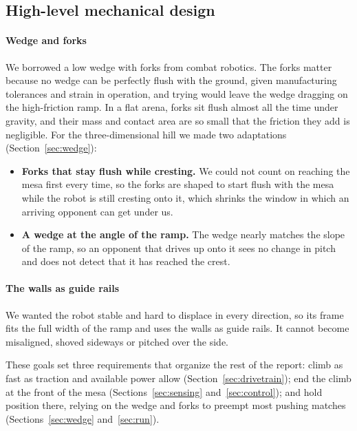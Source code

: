 \subsection{High-level mechanical design}
\label{sec:concept}

\paragraph{Wedge and forks}
We borrowed a low wedge with forks from combat robotics. The forks matter because no wedge can be perfectly flush with the ground, given manufacturing tolerances and strain in operation, and trying would leave the wedge dragging on the high-friction ramp. In a flat arena, forks sit flush almost all the time under gravity, and their mass and contact area are so small that the friction they add is negligible. For the three-dimensional hill we made two adaptations (Section~\ref{sec:wedge}):
\begin{itemize}
  \item \textbf{Forks that stay flush while cresting.} We could not count on reaching the mesa first every time, so the forks are shaped to start flush with the mesa while the robot is still cresting onto it, which shrinks the window in which an arriving opponent can get under us.
  \item \textbf{A wedge at the angle of the ramp.} The wedge nearly matches the slope of the ramp, so an opponent that drives up onto it sees no change in pitch and does not detect that it has reached the crest.
\end{itemize}

\paragraph{The walls as guide rails}
We wanted the robot stable and hard to displace in every direction, so its frame fits the full width of the ramp and uses the walls as guide rails. It cannot become misaligned, shoved sideways or pitched over the side.

These goals set three requirements that organize the rest of the report: climb as fast as traction and available power allow (Section~\ref{sec:drivetrain}); end the climb at the front of the mesa (Sections~\ref{sec:sensing} and~\ref{sec:control}); and hold position there, relying on the wedge and forks to preempt most pushing matches (Sections~\ref{sec:wedge} and~\ref{sec:run}).
